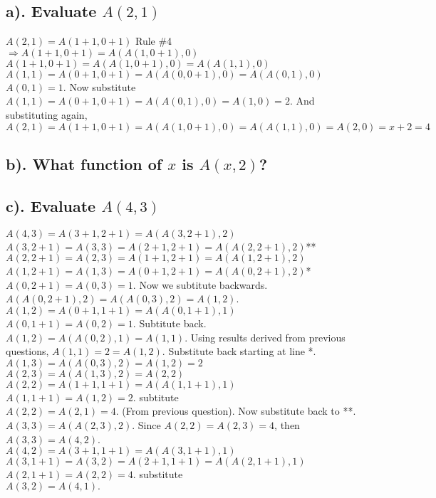 \documentclass[20pt]{article} %
\begin{document}
\subsection{a). Evaluate $A(2,1)$}
$A(2,1)=A(1+1, 0+1)$ Rule \#4 $\Rightarrow A(1+1, 0+1) = A(A(1, 0+1), 0)$ \\
$A(1+1, 0+1) = A(A(1, 0+1), 0) = A(A(1,1), 0)$ \\
$A(1,1) = A(0+1, 0+1) = A(A(0, 0+1), 0) = A(A(0,1),0)$ \\
$A(0,1) = 1$. Now substitute \\
$A(1,1) = A(0+1, 0+1) = A(A(0, 1),0) = A(1,0) = 2$. And substituting again, \\
$A(2,1) = A(1+1, 0+1) = A(A(1, 0+1), 0) = A(A(1,1), 0) = A(2, 0) = x+2 = 4$
\subsection{b). What function of $x$ is $A(x,2)$?}
\subsection{c). Evaluate $A(4,3)$}
$A(4,3) = A(3+1,2+1) = A(A(3,2+1), 2)$ \\
$A(3, 2+1) = A(3, 3) = A(2+1, 2+1) = A(A(2, 2+1), 2)$** \\
$A(2, 2+1) = A(2,3) = A(1+1, 2+1) = A(A(1, 2+1), 2)$ \\
$A(1, 2+1) = A(1,3) = A(0+1, 2+1) = A(A(0, 2+1), 2)$*\\
$A(0, 2+1) = A(0,3) = 1$.  Now we subtitute backwards. \\
$A(A(0, 2+1), 2) = A(A(0,3),2) = A(1,2)$. \\
$A(1,2) = A(0+1, 1+1) = A(A(0, 1+1), 1)$ \\
$A(0, 1+1) = A(0,2) = 1$. Subtitute back. \\
$A(1,2) = A(A(0,2), 1) = A(1,1)$. Using results derived from previous questions, $A(1,1) = 2 = A(1,2)$.  Substitute back starting at line *.\\
$A(1,3) = A(A(0, 3), 2) = A(1,2) = 2$ \\
$A(2,3) = A(A(1,3),2) = A(2,2)$ \\
$A(2,2) = A(1+1, 1+1) = A(A(1, 1+1), 1)$ \\
$A(1, 1+1) = A(1,2) = 2$. subtitute \\
$A(2,2) = A(2, 1) = 4$. (From previous question). Now substitute back to **.
$A(3,3) = A(A(2,3), 2).$ Since $A(2,2) = A(2,3) = 4$, then $A(3,3) = A(4, 2)$. \\
$A(4,2) = A(3+1, 1+1) = A(A(3, 1+1), 1)$ \\
$A(3, 1+1) = A(3, 2) = A(2+1, 1+1) = A(A(2, 1+1), 1)$ \\
$A(2, 1+1) = A(2,2) = 4$. substitute \\
$A(3,2) = A(4, 1).$\\
\end{document}

